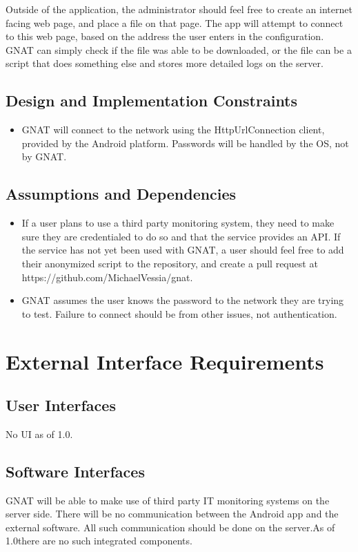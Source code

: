 \documentclass{scrreprt}
\def\version{1.0}
\def\sourcecode{https://github.com/MichaelVessia/gnat}
\begin{document}
Outside of the application, the administrator should feel free to create an internet facing web page, and place a file on that page.  The app will attempt to connect to this web page, based on the address the user enters in the configuration. GNAT can simply check if the file was able to be downloaded, or the file can be a script that does something else and stores more detailed logs on the server.

\section{Design and Implementation Constraints}

\begin{itemize}
  \item GNAT will connect to the network using the HttpUrlConnection client, provided by the Android platform. Passwords will be handled by the OS, not by GNAT\@.
\end{itemize}

\section{Assumptions and Dependencies}

\begin{itemize}
  \item If a user plans to use a third party monitoring system, they need to make sure they are credentialed to do so and that the service provides an API\@. If the service has not yet been used with GNAT, a user should feel free to add their anonymized script to the repository, and create a pull request at \sourcecode.
  \item GNAT assumes the user knows the password to the network they are trying to test.  Failure to connect should be from other issues, not authentication.
\end{itemize}

\chapter{External Interface Requirements}

\section{User Interfaces}

No UI as of \version.

\section{Software Interfaces}
GNAT will be able to make use of third party IT monitoring systems on the server side.  There will be no communication between the Android app and the external software. All such communication should be done on the server.As of \version there are no such integrated components.
\end{document}
